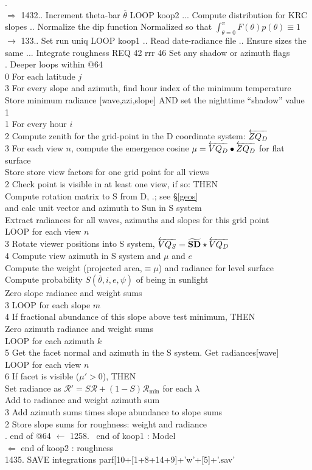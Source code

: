 \documentclass{article}
\newcommand{\qh}[1]{\\ \hspace*{#1.em} #1 \hspace*{0.4em} } %
\newcommand{\qH}[1]{\\ \hspace*{#1.em}  \hspace*{1.3em} } %
\begin{document}
. \\ $\Longrightarrow$ 1432.. Increment theta-bar $\overline{\theta}$  LOOP  koop2
... Compute distribution for KRC slopes 
.. Normalize the dip function 
\qii  Normalized so that $\int_{\theta=0}^\pi F(\theta)p(\theta) \equiv 1 $
\qi $\longrightarrow$  
133.. Set run uniq  LOOP koop1
.. Read date-radiance file
.. Ensure sizes the same
... Integrate roughness REQ 42 rrr 46 
\qiii Set any shadow or azimuth flags  %
\\ .  \hrulefill Deeper loops within @64 \hrulefill \hspace{3.in}
\qh{0} For each latitude $j$
\qh{3} For every slope and azimuth, find hour index of the minimum temperature %
\qH{3} Store minimum radiance [wave,azi,slope] AND set the nighttime ``shadow'' value 
\qh{1} 
\qh{1} For every hour $i$
\qh{2} Compute zenith for the grid-point in the D coordinate system: $\overleftarrow{ZQ_D}$
\qh{3} For each view $n$, compute the emergence cosine $\mu =\overleftarrow{VQ_D} \bullet \overleftarrow{ZQ_D}$ for flat surface %
\qH{3} Store store view factors for one grid point for all views %
\qh{2} Check point is visible in at least one view, if so: THEN
\qH{2} Compute rotation matrix to S from D, .; see \S \ref{geos}   %
\qH{2} and calc unit vector and azimuth to Sun in S system  
\qH{2} Extract radiances for all waves, azimuths and slopes for this grid point %
\qH{2} LOOP for each view $n$ %
\qh{3} Rotate viewer positions into S system, $\overleftarrow{VQ_S} = \widetilde {\mathbf{ SD }} \star  \overleftarrow{VQ_D}$
\qh{4} Compute view azimuth in S system  and $\mu$  and $e$ %
\qH{4} Compute the weight (projected area,$ \equiv \mu$) and radiance for level surface %
\qH{4} Compute probability $S( \overline{\theta},i,e,\psi)$ of being in sunlight
\qH{4} Zero slope radiance  and weight sums
\qh{3} LOOP for each slope $m$  %
\qh{4} If fractional abundance of this slope above test minimum, THEN 
\qH{3} Zero azimuth radiance and weight sums 
\qH{4} LOOP for each azimuth $k$ %
\qh{5} Get the facet normal and azimuth in the S system. Get radiances[wave] %
\qH{5} LOOP for each view $n$
\qh{6} If facet is visible ($\mu'>0$), THEN  
\qH{6} Set radiance as $\mathcal{R}' = S \mathcal{R} + (1-S) \mathcal{R_\mathrm{min}}$ for each $\lambda $
\qH{6} Add to radiance and weight azimuth sum %
\qh{3} Add azimuth sums times slope abundance to slope sums  %
\qh{2} Store slope sums for roughness:  weight and radiance %
\\ . \hrulefill end of @64 \hrulefill \hspace{3.in}
\qi $\longleftarrow$ 1258. \ end of koop1 : Model
\\ $\Longleftarrow$    end of koop2 : roughness
\\ 1435. SAVE  integrations parf[10+[1+8+14+9]+'w'+[5]+'.sav'
\end{document}
